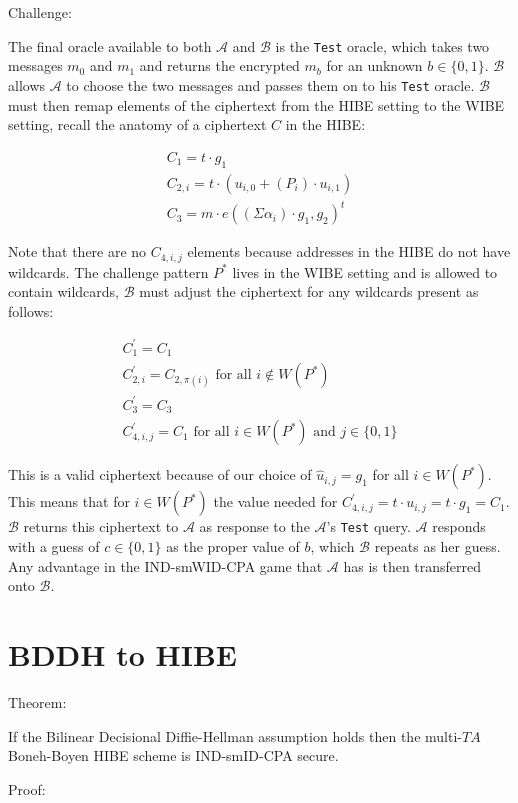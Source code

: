 \documentclass[10pt]{article}
\newcommand{\A}{\mathcal{A}}
\newcommand{\B}{\mathcal{B}}
\newcommand{\TA}{\mathit{TA}}
\begin{document}
Challenge:

The final oracle available to both $\A$ and $\B$ is the \texttt{Test} oracle, which takes two messages $m_0$ and $m_1$ and returns the encrypted $m_b$ for an unknown $b \in \{0,1\}$.  $\B$ allows $\A$ to choose the two messages and passes them on to his \texttt{Test} oracle.  $\B$ must then remap elements of the ciphertext from the HIBE setting to the WIBE setting, recall the anatomy of a ciphertext $C$ in the HIBE:

\begin{align*}
C_1 = t \cdot g_1\\
C_{2,i} = t \cdot (u_{i,0} + (P_i) \cdot u_{i,1})\\
C_3 = m \cdot e((\Sigma \alpha_i) \cdot g_1, g_2)^t
\end{align*}

Note that there are no $C_{4,i,j}$ elements because addresses in the HIBE do not have wildcards.  The challenge pattern $P^*$ lives in the WIBE setting and is allowed to contain wildcards, $\B$ must adjust the ciphertext for any wildcards present as follows:

\begin{align*}
C^\prime_1 = C_1\\
C^\prime_{2,i} = C_{2,\pi(i)} \text{ for all } i \not\in W(P^*)\\
C^\prime_3 = C_3\\
C^\prime_{4,i,j} = C_1 \text{ for all } i \in W(P^*) \text{ and } j \in \{0,1\}
\end{align*}

This is a valid ciphertext because of our choice of $\hat u_{i,j} = g_1$ for all $i \in W(P^*)$.  This means that for $i \in W(P^*)$ the value needed for $C^\prime_{4,i,j} = t \cdot u_{i,j} = t \cdot g_1 = C_1$.  $\B$ returns this ciphertext to $\A$ as response to the $\A$'s \texttt{Test} query.  $\A$ responds with a guess of $c \in \{0,1\}$ as the proper value of $b$, which $\B$ repeats as her guess.  Any advantage in the IND-smWID-CPA game that $\A$ has is then transferred onto $\B$.

\section*{BDDH to HIBE}

Theorem:

If the Bilinear Decisional Diffie-Hellman assumption holds then the multi-$\TA$ Boneh-Boyen HIBE scheme is IND-smID-CPA secure.

Proof:
\end{document}

